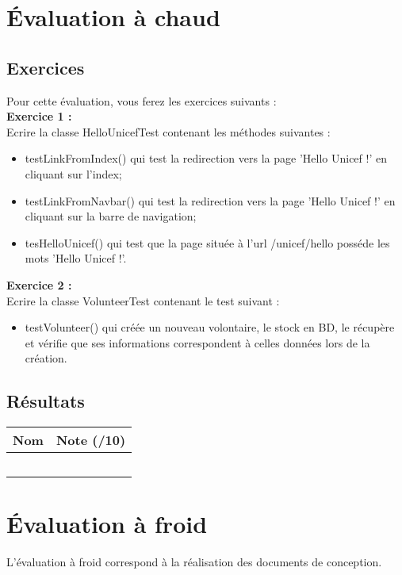 \documentclass[asi, sansVersion]{picInsa}
\begin{document}
	\newpage
	\section*{Évaluation à chaud}
		\subsection*{Exercices}
		Pour cette évaluation, vous ferez les exercices suivants : 
		\\
		
		\textbf{Exercice 1 :}\\
		Ecrire la classe HelloUnicefTest contenant les méthodes suivantes :
		\begin{itemize}
			\item testLinkFromIndex() qui test la redirection vers la page 'Hello Unicef !' en cliquant sur l'index;
			\item testLinkFromNavbar() qui test la redirection vers la page 'Hello Unicef !' en cliquant sur la barre de navigation;
			\item tesHelloUnicef() qui test que la page située à l'url /unicef/hello posséde les mots 'Hello Unicef !'.
		\end{itemize}
		
		\textbf{Exercice 2 :}\\
		Ecrire la classe VolunteerTest contenant le test suivant : 
		\begin{itemize}
			\item testVolunteer() qui créée un nouveau volontaire, le stock en BD, le récupère et vérifie que ses informations correspondent à celles données lors de la création.
		\end{itemize}
		
			\vspace{8px}
			
		\subsection*{Résultats}
			\begin{longtable}{|p{0.5\textwidth}|p{}|}
				\hline
					\rowcolor[gray]{0.90} Nom & Note (/10) \\
				
				\hline
					\Mathieu &  \\
				\hline
					\Matthieu &  \\
				\hline
					\Kafui &  \\
				\hline
					\Melissa &  \\
				\hline
					\Florian &  \\
				\hline
			
			\end{longtable}
			
	\newpage
	\section*{Évaluation à froid}
		L'évaluation à froid correspond à la réalisation des documents de conception.
\end{document}
